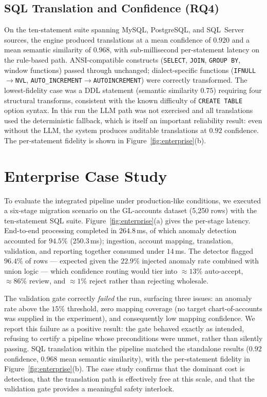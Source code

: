 \documentclass{ieeeaccess}
\begin{document}
\subsection{SQL Translation and Confidence (RQ4)}
\label{subsec:translation}
On the ten-statement suite spanning MySQL, PostgreSQL, and SQL~Server sources, the engine produced translations at a mean
confidence of $0.920$ and a mean semantic similarity of $0.968$, with sub-millisecond per-statement latency on the
rule-based path. ANSI-compatible constructs (\texttt{SELECT}, \texttt{JOIN}, \texttt{GROUP BY}, window functions) passed
through unchanged; dialect-specific functions (\texttt{IFNULL}$\rightarrow$\texttt{NVL},
\texttt{AUTO\_INCREMENT}$\rightarrow$\texttt{AUTOINCREMENT}) were correctly transformed. The lowest-fidelity case was a DDL
statement (semantic similarity $0.75$) requiring four structural transforms, consistent with the known difficulty of
\texttt{CREATE TABLE} option syntax. In this run the LLM path was not exercised and all translations used the
deterministic fallback, which is itself an important reliability result: even without the LLM, the system produces
auditable translations at $0.92$ confidence. The per-statement fidelity is shown in Figure~\ref{fig:enterprise}(b).

\section{Enterprise Case Study}
\label{sec:casestudy}
To evaluate the integrated pipeline under production-like conditions, we executed a six-stage migration scenario on the
GL-accounts dataset (5{,}250 rows) with the ten-statement SQL suite. Figure~\ref{fig:enterprise}(a) gives the per-stage
latency. End-to-end processing completed in $264.8$\,ms, of which anomaly detection accounted for $94.5\%$ ($250.3$\,ms);
ingestion, account mapping, translation, validation, and reporting together consumed under $14$\,ms. The detector flagged
$96.4\%$ of rows --- expected given the $22.9\%$ injected anomaly rate combined with union logic --- which confidence
routing would tier into $\approx13\%$ auto-accept, $\approx86\%$ review, and $\approx1\%$ reject rather than rejecting
wholesale.

The validation gate correctly \emph{failed} the run, surfacing three issues: an anomaly rate above the $15\%$ threshold,
zero mapping coverage (no target chart-of-accounts was supplied in the experiment), and consequently low mapping
confidence. We report this failure as a positive result: the gate behaved exactly as intended, refusing to certify a
pipeline whose preconditions were unmet, rather than silently passing. SQL translation within the pipeline matched the
standalone results ($0.92$ confidence, $0.968$ mean semantic similarity), with the per-statement fidelity in
Figure~\ref{fig:enterprise}(b). The case study confirms that the dominant cost is detection, that the translation path is
effectively free at this scale, and that the validation gate provides a meaningful safety interlock.
\end{document}
